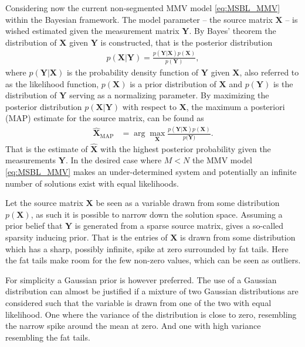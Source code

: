 Considering now the current non-segmented MMV model \eqref{eq:MSBL_MMV} within the Bayesian framework. The model parameter -- the source matrix $\textbf{X}$ -- is wished estimated given the measurement matrix $\textbf{Y}$. 
By Bayes' theorem the distribution of $\textbf{X}$ given $\textbf{Y}$ is constructed, that is the posterior distribution 
\begin{align*}
p(\mathbf{X}|\mathbf{Y}) = \frac{p(\mathbf{Y}|\mathbf{X}) p(\mathbf{X})}{p(\mathbf{Y})},
\end{align*} 
where $p(\mathbf{Y}|\mathbf{X})$ is the probability density function of $\mathbf{Y}$ given $\mathbf{X}$, also referred to as the likelihood function, $p(\mathbf{X})$ is a prior distribution of $\mathbf{X}$ and $p(\mathbf{Y})$ is the distribution of $\mathbf{Y}$ serving as a normalizing parameter.
By maximizing the posterior distribution $p(\mathbf{X}|\mathbf{Y})$ with respect to $\mathbf{X}$, the maximum a posteriori (MAP) estimate for the source matrix, can be found as
\begin{align*}
\hat{\mathbf{X}}_{\text{MAP}} &= \arg \max_{\mathbf{X}} \frac{p(\mathbf{Y} \vert \mathbf{X}) p(\mathbf{X})}{p(\mathbf{Y)}}.
\end{align*}
That is the estimate of $\hat{\mathbf{X}}$ with the highest posterior probability given the measurements $\mathbf{Y}$. 
In the desired case where $M < N$ the MMV model \eqref{eq:MSBL_MMV} makes an under-determined system and potentially an infinite number of solutions exist with equal likelihoods.  

Let the source matrix $\mathbf{X}$ be seen as a variable drawn from some distribution $p(\mathbf{X})$, as such it is possible to narrow down the solution space. 
Assuming a prior belief that $\mathbf{Y}$ is generated from a sparse source matrix, gives a so-called sparsity inducing prior. 
That is the entries of $\mathbf{X}$ is drawn from some distribution which has a sharp, possibly infinite, spike at zero surrounded by fat tails. Here the fat tails make room for the few non-zero values, which can be seen as outliers.

For simplicity a Gaussian prior is however preferred. 
The use of a Gaussian distribution can almost be justified if a mixture of two Gaussian distributions are considered such that the variable is drawn from one of the two with equal likelihood. 
One where the variance of the distribution is close to zero, resembling the narrow spike around the mean at zero. 
And one with high variance resembling the fat tails.       

